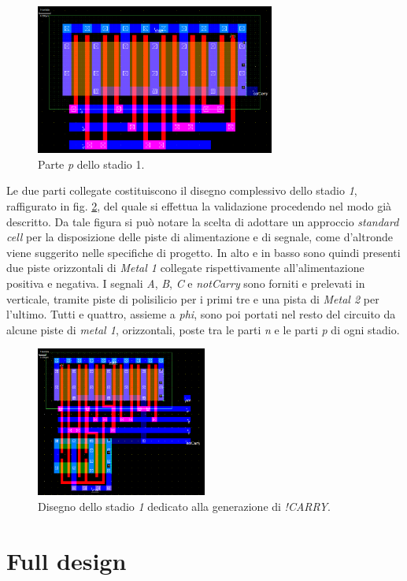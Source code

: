 \begin{figure}[hbt!]
	\centering
	\includegraphics[width=0.7\textwidth]{figure/Msk_PMOS_notCarry_V2.png}
	\caption{Parte \textit{p} dello stadio 1.}
	\label{fig:PMOSnotCarry}
\end{figure} 

Le due parti collegate costituiscono il disegno complessivo dello stadio \textit{1}, raffigurato in fig. \ref{fig:notCarry}, del quale si effettua la validazione procedendo nel modo già descritto. Da tale figura si può notare la scelta di adottare un approccio \textit{standard cell} per la disposizione delle piste di alimentazione e di segnale, come d'altronde viene suggerito nelle specifiche di progetto. In alto e in basso sono quindi presenti due piste orizzontali di \textit{Metal 1} collegate rispettivamente all'alimentazione positiva e negativa. I segnali \textit{A}, \textit{B}, \textit{C} e \textit{notCarry} sono forniti e prelevati in verticale, tramite piste di polisilicio per i primi tre e una pista di \textit{Metal 2} per l'ultimo. Tutti e quattro, assieme a \textit{phi}, sono poi portati nel resto del circuito da alcune piste di \textit{metal 1}, orizzontali, poste tra le parti \textit{n} e le parti \textit{p} di ogni stadio.

\begin{figure}[hbt!]
	\centering
	\includegraphics[width=0.5\textwidth]{figure/Msk_NotCarry_V2.png}
	\caption{Disegno dello stadio \textit{1} dedicato alla generazione di \textit{!CARRY}.}
	\label{fig:notCarry}
\end{figure} 

\section{Full design}
\label{sec:sec_fullDesign}






